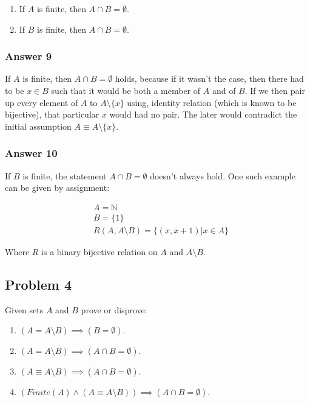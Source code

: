 \documentclass[11pt]{article}
\begin{document}
\begin{enumerate}
\item If $A$ is finite, then $A \cap B = \emptyset$.
\item If $B$ is finite, then $A \cap B = \emptyset$.
\end{enumerate}

\subsubsection{Answer 9}
\label{sec-1-3-1}
If $A$ is finite, then $A \cap B = \emptyset$ holds, because if it wasn't the
case, then there had to be $x \in B$ such that it would be both a member of $A$
and of $B$.  If we then pair up every element of $A$ to $A \setminus \{x\}$ using,
identity relation (which is known to be bijective), that particular $x$ would had
no pair.  The later would contradict the initial assumption
$A \equiv A \setminus \{x\}$.
\subsubsection{Answer 10}
\label{sec-1-3-2}
If $B$ is finite, the statement $A \cap B = \emptyset$ doesn't always hold.
One such example can be given by assignment:

\begin{equation}
\begin{split}
& A = \mathbb{N} \\
& B = \{1\} \\
& R(A, A \setminus B) = \{(x, x + 1) | x \in A\}
\end{split}
\end{equation}

Where $R$ is a binary bijective relation on $A$ and $A \setminus B$.
\subsection{Problem 4}
\label{sec-1-4}
Given sets $A$ and $B$ prove or disprove:

\begin{enumerate}
\item $(A = A \setminus B) \implies (B = \emptyset)$.
\item $(A = A \setminus B) \implies (A \cap B = \emptyset)$.
\item $(A \equiv A \setminus B) \implies (A \cap B = \emptyset)$.
\item $(Finite(A) \land (A \equiv A \setminus B)) \implies (A \cap B = \emptyset)$.
\end{enumerate}
\end{document}
